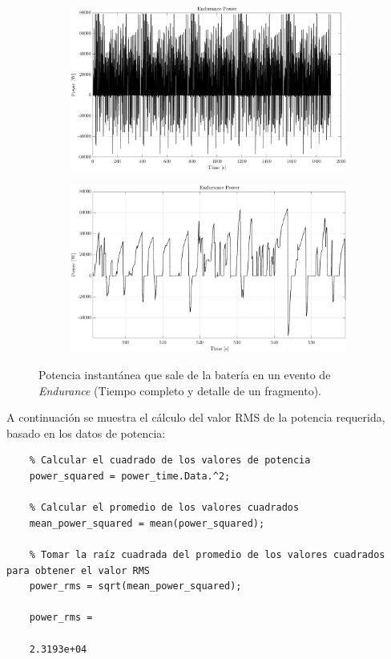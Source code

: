 \begin{figure}[H]
	\centering
	\begin{subfigure}[b]{0.45\textwidth}
		\centering
		\includegraphics[width=\textwidth]{fig/powerRMS}
	\end{subfigure}
	\hfill
	\begin{subfigure}[b]{0.45\textwidth}
		\centering
		\includegraphics[width=\textwidth]{fig/powerRMS-zoom}
	\end{subfigure}
	\caption{Potencia instantánea que sale de la batería en un evento de \textit{Endurance} (Tiempo completo y detalle de un fragmento).}
\end{figure}

A continuación se muestra el cálculo del valor RMS de la potencia requerida, basado en los datos de potencia:

\begin{verbatim}
	% Calcular el cuadrado de los valores de potencia
	power_squared = power_time.Data.^2;
	
	% Calcular el promedio de los valores cuadrados
	mean_power_squared = mean(power_squared);
	
	% Tomar la raíz cuadrada del promedio de los valores cuadrados para obtener el valor RMS
	power_rms = sqrt(mean_power_squared);
	
	power_rms =
	
	2.3193e+04
\end{verbatim}


